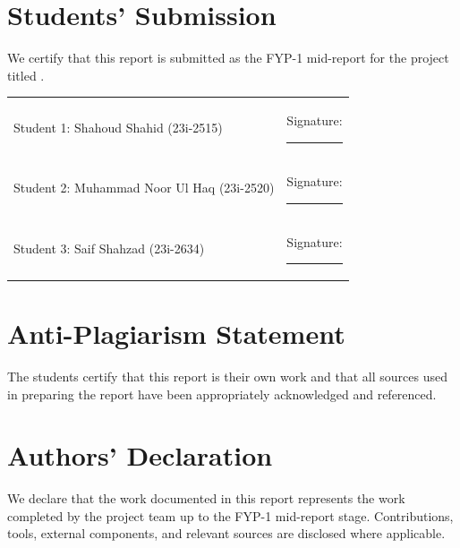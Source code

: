 \documentclass{fast-nuces-bs}
\title{}
\newcommand{\projecttitle}{}%
\newcommand{\studentone}{Shahoud Shahid (23i-2515)}
\newcommand{\studenttwo}{Muhammad Noor Ul Haq (23i-2520)}
\newcommand{\studentthree}{Saif Shahzad (23i-2634)}
\begin{document}


\cleardoublepage
{}
\chapter*{Students' Submission}
We certify that this report is submitted as the FYP-1 mid-report for the project titled \textit{\projecttitle}.
\par\vspace{1cm}\noindent
\begin{tabular}{p{}p{}}
Student 1: \studentone & Signature: \rule{0.25\textwidth}{0.4pt}\\[1cm]
Student 2: \studenttwo & Signature: \rule{0.25\textwidth}{0.4pt}\\[1cm]
Student 3: \studentthree & Signature: \rule{0.25\textwidth}{0.4pt}
\end{tabular}

\chapter*{Anti-Plagiarism Statement}
The students certify that this report is their own work and that all sources used in preparing the report have been appropriately acknowledged and referenced.

\chapter*{Authors' Declaration}
We declare that the work documented in this report represents the work completed by the project team up to the FYP-1 mid-report stage. Contributions, tools, external components, and relevant sources are disclosed where applicable.
\end{document}
